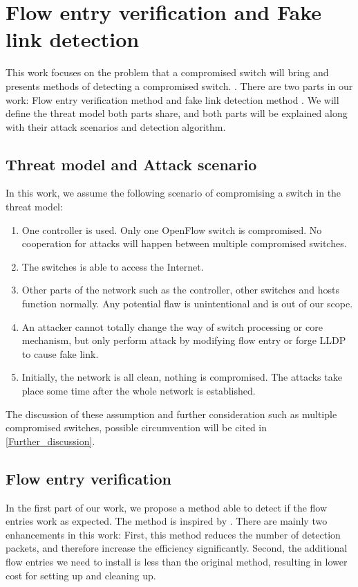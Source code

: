 \chapter{Flow entry verification and Fake link detection}
This work focuses on the problem that a compromised switch will bring and presents methods of detecting a compromised switch. \sout{}. There are two parts in our work: Flow entry verification method and fake link detection method \sout{}. We will define the threat model both parts share, and both parts will be explained along with their attack scenarios and detection algorithm.

\section{Threat model and Attack scenario}
In this work, we assume the following scenario of compromising a switch in the threat model:
\begin{enumerate}
\item
One controller is used. Only one OpenFlow switch is compromised. No cooperation for attacks will happen between multiple compromised switches.
\item
The switches is able to access the Internet. 
\item
Other parts of the network such as the controller, other switches and hosts function normally. Any potential flaw is unintentional and is out of our scope.
\item
An attacker cannot totally change the way of switch processing or core mechanism, but only perform attack by modifying flow entry or forge LLDP to cause fake link.
\item
Initially, the network is all clean, nothing is compromised. The attacks take place some time after the whole network is established.
\end{enumerate}

The discussion of these assumption and further consideration such as multiple compromised switches, possible circumvention will be cited in \ref{Further_discussion}.

\section{Flow entry verification}
In the first part of our work, we propose a method able to detect if the flow entries work as expected. The method is inspired by \cite{CKGL15}. There are mainly two enhancements in this work: First, this method reduces the number of detection packets, and therefore increase the efficiency significantly. Second, the additional flow entries we need to install is less than the original method, resulting in lower cost for setting up and cleaning up. 

